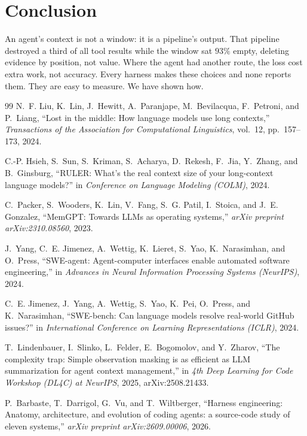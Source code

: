 \documentclass[10pt,conference]{IEEEtran}
\begin{document}
\section{Conclusion}

An agent's context is not a window: it is a pipeline's output. That
pipeline destroyed a third of all tool results while the window sat
$93\%$ empty, deleting evidence by position, not value. Where the
agent had another route, the loss cost extra work, not accuracy. Every
harness makes these choices and none reports them. They are easy to
measure. We have shown how.

\balance

\begin{thebibliography}{99}
N.~F. Liu, K.~Lin, J.~Hewitt, A.~Paranjape, M.~Bevilacqua, F.~Petroni, and
P.~Liang, ``Lost in the middle: How language models use long contexts,''
\emph{Transactions of the Association for Computational Linguistics}, vol.~12,
pp.~157--173, 2024.

C.-P. Hsieh, S.~Sun, S.~Kriman, S.~Acharya, D.~Rekesh, F.~Jia, Y.~Zhang,
and B.~Ginsburg, ``{RULER}: What's the real context size of your
long-context language models?'' in \emph{Conference on Language Modeling
(COLM)}, 2024.

C.~Packer, S.~Wooders, K.~Lin, V.~Fang, S.~G. Patil, I.~Stoica, and J.~E.
Gonzalez, ``{MemGPT}: Towards {LLMs} as operating systems,'' \emph{arXiv
preprint arXiv:2310.08560}, 2023.

J.~Yang, C.~E. Jimenez, A.~Wettig, K.~Lieret, S.~Yao, K.~Narasimhan, and
O.~Press, ``{SWE-agent}: Agent-computer interfaces enable automated software
engineering,'' in \emph{Advances in Neural Information Processing Systems
(NeurIPS)}, 2024.

C.~E. Jimenez, J.~Yang, A.~Wettig, S.~Yao, K.~Pei, O.~Press, and
K.~Narasimhan, ``{SWE-bench}: Can language models resolve real-world {GitHub}
issues?'' in \emph{International Conference on Learning Representations
(ICLR)}, 2024.

T.~Lindenbauer, I.~Slinko, L.~Felder, E.~Bogomolov, and Y.~Zharov, ``The
complexity trap: Simple observation masking is as efficient as {LLM}
summarization for agent context management,'' in \emph{4th Deep Learning
for Code Workshop (DL4C) at NeurIPS}, 2025, arXiv:2508.21433.

P.~Barbaste, T.~Darrigol, G.~Vu, and T.~Wiltberger, ``Harness engineering:
Anatomy, architecture, and evolution of coding agents: a source-code study
of eleven systems,'' \emph{arXiv preprint arXiv:2609.00006}, 2026.


\end{thebibliography}
\end{document}
